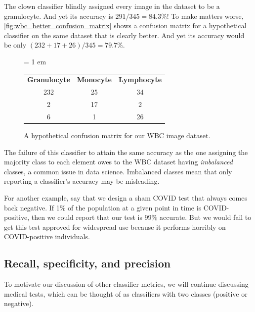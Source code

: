 \begin{qbox}\end{qbox}

The clown classifier blindly assigned every image in the dataset to be a granulocyte. And yet its accuracy is $291/345 = 84.3\%$! To make matters worse, \autoref{fig:wbc_better_confusion_matrix} shows a confusion matrix for a hypothetical classifier on the same dataset that is clearly better. And yet its accuracy would be only $(232 + 17 + 26)/345 = 79.7\%$.\\

\begin{figure}[h]
\centering
\tabcolsep = 1 em
\mySfFamily
\begin{tabular}{c c c}
\textbf{Granulocyte} & \textbf{Monocyte} & \textbf{Lymphocyte} \\
232 & 25 & 34 \\
2 & 17 & 2 \\
6 & 1 & 26
\end{tabular}
\caption{A hypothetical confusion matrix for our WBC image dataset.}
\label{fig:wbc_better_confusion_matrix}
\end{figure}

The failure of this classifier to attain the same accuracy as the one assigning the majority class to each element owes to the WBC dataset having \textit{imbalanced} classes, a common issue in data science. Imbalanced classes mean that only reporting a classifier's accuracy may be misleading.

For another example, say that we design a sham COVID test that always comes back negative. If 1\% of the population at a given point in time is COVID-positive, then we could report that our test is 99\% accurate. But we would fail to get this test approved for widespread use because it performs horribly on COVID-positive individuals.\\

\begin{qbox}\end{qbox}

\FloatBarrier
{}
\subsection{Recall, specificity, and precision}

To motivate our discussion of other classifier metrics, we will continue discussing medical tests, which can be thought of as classifiers with two classes (positive or negative).

